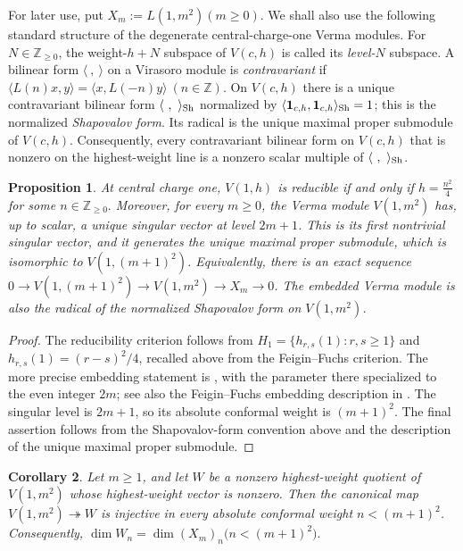 \documentclass[12pt,leqno]{amsart}
\numberwithin{equation}{section} \newtheorem{thm}{Theorem}[section] \newtheorem{lem}[thm]{Lemma} \newtheorem{ex}[thm]{Example} \newtheorem{prop}[thm]{Proposition} \newtheorem{cor}[thm]{Corollary} \newtheorem{defi}[thm]{Definition} \newtheorem{rmk}[thm]{Remark} \newtheorem{notation}[thm]{Notation}
\newcommand{\one}{\mathbf{1}}
\def\Z{\mathbb{Z}} \def\N{\mathbb{N}} \def\A{\mathbb{A}} \def\C{\mathbb{C}} \def\R{\mathbb{R}} \def\Q{\mathbb{Q}} \def\F{\mathbb{F}}
\begin{document}
For later use, put \(X_m:=L(1,m^2)(m\ge0).\) We shall also use the following standard structure of the degenerate central-charge-one Verma modules. For $N\in\Z_{\ge0}$, the weight-$h+N$ subspace of $V(c,h)$ is called its \emph{level-$N$} subspace. A bilinear form $\langle\ ,\ \rangle$ on a Virasoro module is \emph{contravariant} if \(\langle L(n)x,y\rangle=\langle x,L(-n)y\rangle\ (n\in\Z).\) On $V(c,h)$ there is a unique contravariant bilinear form $\langle\ ,\ \rangle_{\rm Sh}$ normalized by $\langle\one_{c,h},\one_{c,h}\rangle_{\rm Sh}=1$; this is the normalized \emph{Shapovalov form}. Its radical is the unique maximal proper submodule of $V(c,h)$. Consequently, every contravariant bilinear form on $V(c,h)$ that is nonzero on the highest-weight line is a nonzero scalar multiple of $\langle\ ,\ \rangle_{\rm Sh}$.

\begin{prop}\label{prop:c1-verma}
At central charge one, $V(1,h)$ is reducible if and only if \(h=\frac{n^2}{4}\) for some \(n\in\Z_{\ge0}.\) Moreover, for every $m\ge0$, the Verma module $V(1,m^2)$ has, up to scalar, a unique singular vector at level $2m+1$. This is its first nontrivial singular vector, and it generates the unique maximal proper submodule, which is isomorphic to $V(1,(m+1)^2)$. Equivalently, there is an exact sequence \(0\longrightarrow V(1,(m+1)^2)\longrightarrow V(1,m^2)\longrightarrow X_m\longrightarrow0\). The embedded Verma module is also the radical of the normalized Shapovalov form on $V(1,m^2)$.
\end{prop}

\begin{proof}
The reducibility criterion follows from $H_1=\{h_{r,s}(1):r,s\ge1\}$ and $h_{r,s}(1)=(r-s)^2/4$, recalled above from the Feigin--Fuchs criterion. The more precise embedding statement is \cite[Proposition~2.1]{Milas}, with the parameter there specialized to the even integer $2m$; see also the Feigin--Fuchs embedding description in \cite{KR}. The singular level is $2m+1$, so its absolute conformal weight is \((m+1)^2.\) The final assertion follows from the Shapovalov-form convention above and the description of the unique maximal proper submodule.
\end{proof}

\begin{cor}\label{cor:c1-verma-low-weight}
Let $m\ge1$, and let $W$ be a nonzero highest-weight quotient of $V(1,m^2)$ whose highest-weight vector is nonzero. Then the canonical map \(V(1,m^2)\twoheadrightarrow W\) is injective in every absolute conformal weight $n<(m+1)^2$. Consequently, \(\dim W_n=\dim(X_m)_n\bigl(n<(m+1)^2\bigr).\)
\end{cor}
\end{document}
